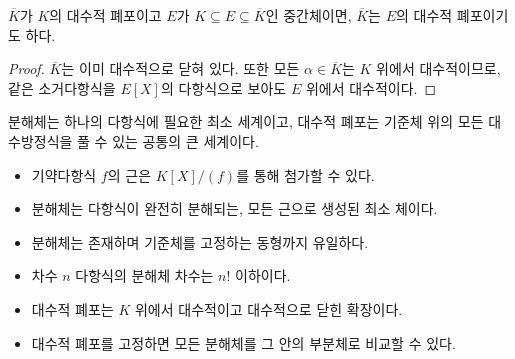 \begin{proposition}
$\overline K$가 $K$의 대수적 폐포이고 $E$가 $K\subseteq E\subseteq\overline K$인 중간체이면, $\overline K$는 $E$의 대수적 폐포이기도 하다.
\end{proposition}

\begin{proof}
$\overline K$는 이미 대수적으로 닫혀 있다. 또한 모든 $\alpha\in\overline K$는 $K$ 위에서 대수적이므로, 같은 소거다항식을 $E[X]$의 다항식으로 보아도 $E$ 위에서 대수적이다.
\end{proof}

\begin{keyidea}
분해체는 하나의 다항식에 필요한 최소 세계이고, 대수적 폐포는 기준체 위의 모든 대수방정식을 풀 수 있는 공통의 큰 세계이다.
\end{keyidea}

\begin{chapterreview}
\begin{itemize}
  \item 기약다항식 $f$의 근은 $K[X]/(f)$를 통해 첨가할 수 있다.
  \item 분해체는 다항식이 완전히 분해되는, 모든 근으로 생성된 최소 체이다.
  \item 분해체는 존재하며 기준체를 고정하는 동형까지 유일하다.
  \item 차수 $n$ 다항식의 분해체 차수는 $n!$ 이하이다.
  \item 대수적 폐포는 $K$ 위에서 대수적이고 대수적으로 닫힌 확장이다.
  \item 대수적 폐포를 고정하면 모든 분해체를 그 안의 부분체로 비교할 수 있다.
\end{itemize}
\end{chapterreview}
